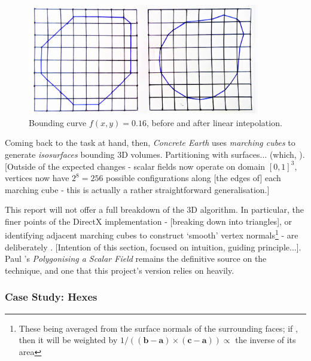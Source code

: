 \documentclass[a4paper, 11pt]{article}
\begin{document}
\begin{flushleft}
\begin{figure}[h]
\centering
\includegraphics[width=0.9\textwidth]{Interpolated Marching Squares}
\caption{Bounding curve $f(x,y) = 0.16$, before and after linear intepolation.}
\label{Interpolated Marching Squares}
\end{figure}

\vspace{5pt}\noindent
Coming back to the task at hand, then, \textit{Concrete Earth} uses \textit{marching cubes} to generate \textit{isosurfaces} bounding 3D volumes. Partitioning with surfaces... (which, ). [Outside of the expected changes - scalar fields now operate on domain $[0,1]^3$, vertices now have $2^8 = 256$ possible configurations along [the edges of] each marching cube - this is actually a rather straightforward generalisation.]

\vspace{5pt}\noindent
This report will not offer a full breakdown of the 3D algorithm. In particular, the finer points of the DirectX implementation - [breaking down into triangles], or identifying adjacent marching cubes to construct `smooth' vertex normals\footnote{These being averaged from the surface normals of the surrounding faces; if , then it will be weighted by $1/((\mathbf{b}-\mathbf{a})\times(\mathbf{c}-\mathbf{a})) \propto$ the inverse of its area} %
- are deliberately . [Intention of this section, focused on intuition, guiding principle...]. Paul \citeauthor{bourkeMarchingCubes}'s \textit{Polygonising a Scalar Field} \citeyearpar{bourkeMarchingCubes} remains the definitive source on the technique, and one that this project's version relies on heavily. %

\subsubsection{Case Study: Hexes}


\end{flushleft}
\end{document}
